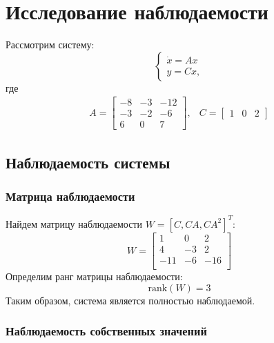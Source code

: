 \section{Исследование наблюдаемости}

Рассмотрим систему: 
\begin{equation}
    \begin{cases}
        \dot{x} = Ax \\
        y = Cx,
    \end{cases}
\end{equation}
где 
\begin{equation}
    \begin{array}{cc}
        A = \begin{bmatrix}
            -8 & -3 & -12 \\
            -3 & -2 & -6 \\
            6 & 0 & 7
        \end{bmatrix}, &
        C = \begin{bmatrix}
            1 & 0 & 2
        \end{bmatrix}
    \end{array}
\end{equation}

\subsection{Наблюдаемость системы}

\subsubsection{Матрица наблюдаемости}
Найдем матрицу наблюдаемости $W = [C, CA, CA^2]^T$: 
\begin{equation}
    W = \begin{bmatrix}
        1  & 0  & 2 \\ 
        4  & -3  & 2 \\ 
        -11  & -6  & -16 \\ 
    \end{bmatrix}
\end{equation}
Определим ранг матрицы наблюдаемости:
\begin{equation}
    \text{rank}(W) = 3
\end{equation}
Таким образом, система является полностью наблюдаемой.

\subsubsection{Наблюдаемость собственных значений}


